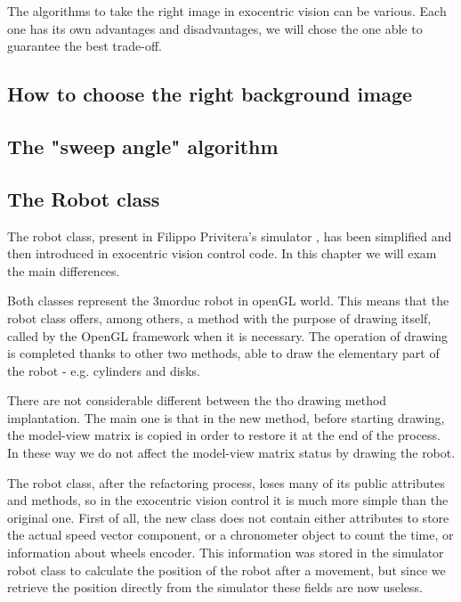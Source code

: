 %
The algorithms to take the right image in exocentric vision can be various. Each one has its own
advantages and disadvantages, we will chose the one able to guarantee the best trade-off.

\subsection{How to choose the right background image}

\subsection{The "sweep angle" algorithm}


\subsection{The Robot class}
The robot class, present in Filippo Privitera's simulator 
\cite{privitera}, has been simplified and then introduced in
exocentric vision control code. In this chapter we will 
exam the main differences.
%

%
Both classes represent the 3morduc robot in openGL world. 
This means that the robot class offers, among others, a
method with the purpose of drawing itself, called by the 
OpenGL framework when it is necessary. The operation of 
drawing is completed thanks to other two methods, able 
to draw the elementary part of the robot - e.g. cylinders and disks.
%

%
There are not considerable different between the tho 
drawing method implantation. The main one is that in the 
new method, before starting drawing, the model-view matrix 
is copied in order to restore it at the end of the process. 
In these way we do not affect the model-view matrix status 
by drawing the robot.
%

%
The robot class, after the refactoring process, loses many 
of its public attributes and methods, so in the
exocentric vision control it is much more simple than the 
original one. First of all, the new class does not contain either
attributes to store the actual speed vector component, or 
a chronometer object to count the time, or information about wheels
encoder. This information was stored in the simulator robot 
class to calculate the position of the robot after a movement,
but since we retrieve the position directly from the simulator 
these fields are now useless. 
%

